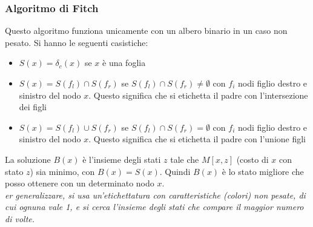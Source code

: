 \documentclass[a4paper,12pt, oneside]{book}
\begin{document}
\subsubsection{Algoritmo di Fitch}
Questo algoritmo funziona unicamente con un albero binario in un caso
non pesato. Si hanno le seguenti casistiche:
\begin{itemize}
  \item $S(x)=\delta_c(x)$ se $x$ è una foglia
  \item $S(x)=S(f_l)\cap S(f_r)$ se $S(f_l)\cap S(f_r)\neq \emptyset$
  con $f_i$ nodi figlio destro e sinistro del nodo $x$. Questo
  significa che si etichetta il padre con l'intersezione dei figli
  \item $S(x)=S(f_l)\cup S(f_r)$ se $S(f_l)\cap S(f_r)= \emptyset$
  con $f_i$ nodi figlio destro e sinistro del nodo $x$. Questo
  significa che si etichetta il padre con l'unione figli
\end{itemize}
La soluzione $B(x)$ è l'insieme degli stati $z$ tale che $M[x,z]$ (costo di
$x$ con stato $z$) sia minimo, con $B(x)=S(x)$. Quindi $B(x)$ è lo stato
migliore che posso ottenere con un determinato nodo $x$.\\
\textit{er generalizzare, si usa un’etichettatura con caratteristiche
  (colori) non pesate, di cui ognuna vale 
  1, e si cerca l’insieme degli stati che compare il maggior numero di
  volte.}
\end{document}
